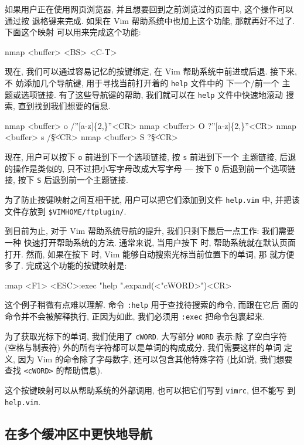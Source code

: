 如果用户正在使用网页浏览器, 并且想要回到之前浏览过的页面中, 这个操作可以通过按
退格键来完成. 如果在 Vim 帮助系统中也加上这个功能, 那就再好不过了. 下面这个映射
可以用来完成这个功能:
\begin{vimcmd}
nmap <buffer> <BS> <C-T>
\end{vimcmd}

现在, 我们可以通过容易记忆的按键绑定, 在 Vim 帮助系统中前进或后退. 接下来, 不
妨添加几个导航键, 用于寻找当前打开着的 \texttt{help} 文件中的 下一个/前一个 主
题或选项链接. 有了这些导航键的帮助, 我们就可以在 \texttt{help} 文件中快速地滚动
搜索, 直到找到我们想要的信息.
\begin{vimcmd}
nmap <buffer> o /''[a-z]\{2,\}''<CR>
nmap <buffer> O ?''[a-z]\{2,\}''<CR>
nmap <buffer> s /\|\S\+\|<CR>
nmap <buffer> S ?\|\S\+\|<CR>
\end{vimcmd}

现在, 用户可以按下 \texttt{o} 前进到下一个选项链接, 按 \texttt{s} 前进到下一个 
主题链接, 后退的操作是类似的, 只不过把小写字母改成大写字母 --- 按下 \texttt{O}
后退到前一个选项链接, 按下 \texttt{S} 后退到前一个主题链接.

\begin{warning}
    为了防止按键映射之间互相干扰, 用户可以把它们添加到文件 \texttt{help.vim} 中,
    并把该文件存放到 \verb'$VIMHOME/ftplugin/'.
\end{warning}

到目前为止, 对于 Vim 帮助系统导航的提升, 我们只剩下最后一点工作: 我们需要一种
快速打开帮助系统的方法. 通常来说, 当用户按下  时, 帮助系统就在默认页面
打开. 然而, 如果在按下  时, Vim 能够自动搜索光标当前位置下的单词, 那
就方便多了. 完成这个功能的按键映射是:
\begin{vimcmd}
:map <F1> <ESC>:exec "help ".expand(<"cWORD>")<CR>
\end{vimcmd}
这个例子稍微有点难以理解. 命令 \texttt{:help} 用于查找待搜索的命令, 而跟在它后
面的命令并不会被解释执行, 正因为如此, 我们必须用 \texttt{:exec} 把命令包裹起来.

为了获取光标下的单词, 我们使用了 \texttt{cWORD}. 大写部分 \texttt{WORD} 表示:除
了空白字符 (空格与制表符) 外的所有字符都可以是单词的构成成分. 我们需要这样的单词
定义, 因为 Vim 的命令除了字母数字, 还可以包含其他特殊字符 (比如说, 我们想要查找
\texttt{<cWORD>} 的帮助信息).

这个按键映射可以从帮助系统的外部调用, 也可以把它们写到 \texttt{vimrc}, 但不能写
到 \texttt{help.vim}.

\subsection{在多个缓冲区中更快地导航}
\label{subsec:faster_navigation_in_multiple_buffers}

